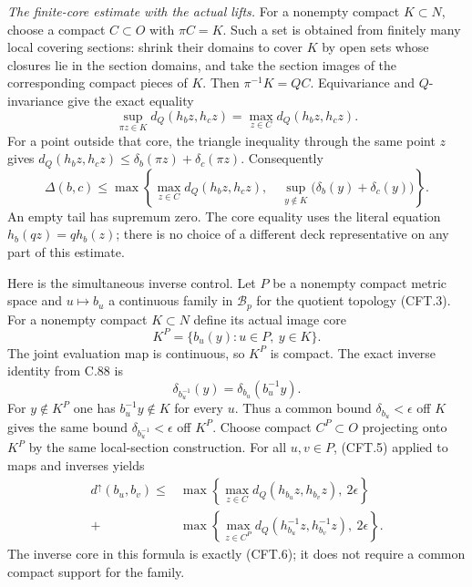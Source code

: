 \documentclass[11pt,a4paper]{article}
\begin{document}
\emph{The finite-core estimate with the actual lifts.}
For a nonempty compact $K\subset N$, choose a compact $C\subset O$
with $\pi C=K$. Such a set is obtained from finitely many
local covering sections: shrink their domains to cover $K$
by open sets whose closures lie in the section domains, and
take the section images of the corresponding compact pieces
of $K$. Then $\pi^{-1}K=QC$. Equivariance and $Q$-invariance
give the exact equality
\[
 \sup_{\pi z\in K}d_Q(h_bz,h_cz)
       =\max_{z\in C}d_Q(h_bz,h_cz).
                                                               \tag{CFT.4}
\]
For a point outside that core, the triangle inequality through
the same point $z$ gives
$d_Q(h_bz,h_cz)\leq\delta_b(\pi z)+\delta_c(\pi z)$.
Consequently
\[
 \Delta(b,c)\leq
 \max\left\{
   \max_{z\in C}d_Q(h_bz,h_cz),\quad
   \sup_{y\notin K}\bigl(\delta_b(y)+\delta_c(y)\bigr)
 \right\}.
                                                               \tag{CFT.5}
\]
An empty tail has supremum zero. The core equality uses the
literal equation $h_b(qz)=qh_b(z)$; there is no choice of a
different deck representative on any part of this estimate.

Here is the simultaneous inverse control. Let $P$ be a nonempty compact
metric space and $u\mapsto b_u$ a continuous family in
$\mathscr B_p$ for the quotient topology (CFT.3). For a nonempty compact
$K\subset N$ define its actual image core
\[
              K^P=\{b_u(y):u\in P,\ y\in K\}.
                                                               \tag{CFT.6}
\]
The joint evaluation map is continuous, so $K^P$ is compact.
The exact inverse identity from C.88 is
\[
              \delta_{b_u^{-1}}(y)
                    =\delta_{b_u}(b_u^{-1}y).
                                                               \tag{CFT.7}
\]
For $y\notin K^P$ one has $b_u^{-1}y\notin K$ for every $u$.
Thus a common bound $\delta_{b_u}<\epsilon$ off $K$ gives the
same bound $\delta_{b_u^{-1}}<\epsilon$ off $K^P$.
Choose compact $C^P\subset O$ projecting onto $K^P$ by the
same local-section construction. For all $u,v\in P$, (CFT.5)
applied to maps and inverses yields
\[
\begin{split}
 d^\uparrow(b_u,b_v)\leq
 &\max\left\{\max_{z\in C}d_Q(h_{b_u}z,h_{b_v}z),\ 2\epsilon\right\}\\
 {}+&\max\left\{\max_{z\in C^P}
            d_Q(h_{b_u}^{-1}z,h_{b_v}^{-1}z),\ 2\epsilon\right\}.
\end{split}                                                    \tag{CFT.8}
\]
The inverse core in this formula is exactly (CFT.6); it does
not require a common compact support for the family.
\end{document}
